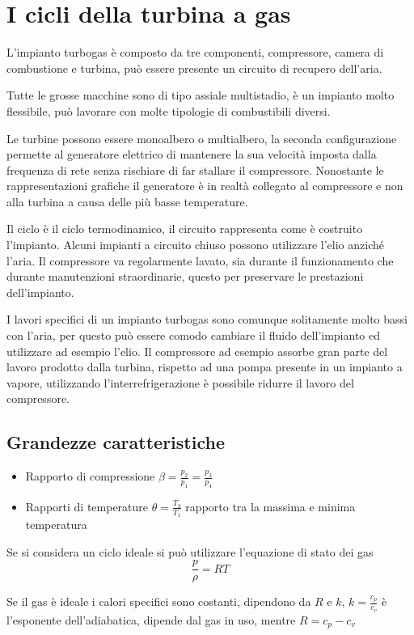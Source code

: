 
\section{I cicli della turbina a gas}
L'impianto turbogas è composto da tre componenti, compressore, camera di
combustione e turbina, può essere presente un circuito di recupero dell'aria.

Tutte le grosse macchine sono di tipo assiale multistadio, è un impianto molto
flessibile, può lavorare con molte tipologie di combustibili diversi.

Le turbine possono essere monoalbero o multialbero, la seconda configurazione
permette al generatore elettrico di mantenere la sua velocità imposta dalla
frequenza di rete senza rischiare di far stallare il compressore.
Nonostante le rappresentazioni grafiche il generatore è in realtà collegato al
compressore e non alla turbina a causa delle più basse temperature.

Il ciclo è il ciclo termodinamico, il circuito rappresenta come è costruito
l'impianto.
Alcuni impianti a circuito chiuso possono utilizzare l'elio anziché l'aria.
Il compressore va regolarmente lavato, sia durante il funzionamento che durante
manutenzioni straordinarie, questo per preservare le prestazioni dell'impianto.

I lavori specifici di un impianto turbogas sono comunque solitamente molto
bassi con l'aria, per questo può essere comodo cambiare il fluido dell'impianto
ed utilizzare ad esempio l'elio. Il compressore ad esempio assorbe gran parte
del lavoro prodotto dalla turbina, rispetto ad una pompa presente in un
impianto a vapore, utilizzando l'interrefrigerazione è possibile ridurre il
lavoro del compressore.


\subsection{Grandezze caratteristiche}
\begin{itemize}
 \item Rapporto di compressione $\beta = \frac{p_2}{p_1} = \frac{p_3}{p_4}$
 \item Rapporti di temperature $\theta = \frac{T_3}{T_1}$ rapporto tra la
massima e minima temperatura
\end{itemize}
Se si considera un ciclo ideale si può utilizzare l'equazione di stato dei gas
$$
\frac{p}{\rho} = RT
$$

Se il gas è ideale i calori specifici sono costanti, dipendono da $R$ e $k$,
$k=\frac{c_p}{c_v}$ è l'esponente dell'adiabatica, dipende dal gas in uso,
mentre $R=c_p-c_v$

